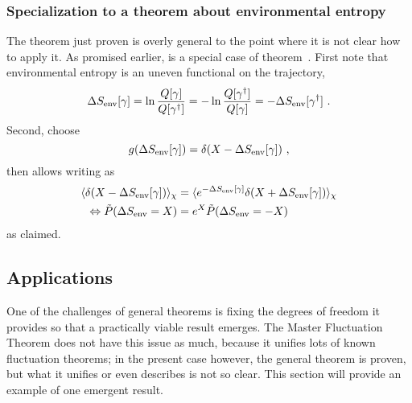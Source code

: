 \subsubsection{Specialization to a theorem about environmental entropy}

The theorem just proven is overly general to the point where it is not clear how to apply it. As promised earlier,  is a special case of theorem~. First note that environmental entropy is an uneven functional on the trajectory,
\begin{equation}
	  \Delta S_\text{env}[\gamma]
	= \ln\frac{Q[\gamma]}{Q[\gamma^\dagger]}
	= -\ln\frac{Q[\gamma^\dagger]}{Q[\gamma]}
	= -\Delta S_\text{env}[\gamma^\dagger] ~.
\end{equation}
%
Second, choose
\begin{equation}
	g(\Delta S_\text{env}[\gamma]) = \delta(X - \Delta S_\text{env}[\gamma]) ~,
\end{equation}
%
then  allows writing  as
%
\begin{align*}
		\langle \delta(X - \Delta S_\text{env}[\gamma])\rangle_\chi
		&=
		\langle e^{-\Delta S_\text{env}[\gamma]}\delta(X + \Delta S_\text{env}[\gamma])\rangle_\chi
	\\ \Leftrightarrow
		\tilde P(\Delta S_\text{env} = X)
		&=
		e^X \tilde P(\Delta S_\text{env} = -X)
\end{align*}
%
as claimed.





\subsection{Applications}

One of the challenges of general theorems is fixing the degrees of freedom it provides so that a practically viable result emerges. The Master Fluctuation Theorem \cite{seifert-review} does not have this issue as much, because it unifies lots of known fluctuation theorems; in the present case however, the general theorem is proven, but what it unifies or even describes is not so clear. This section will provide an example of one emergent result.

